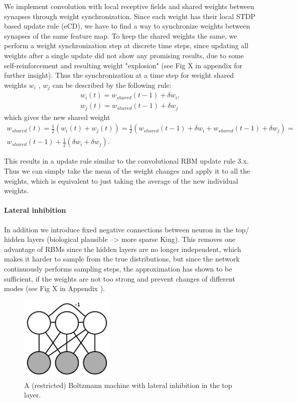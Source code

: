 We implement convolution with local receptive fields and shared weights between synapses through weight synchronization.
Since each weight has their local STDP based update rule (eCD), we have to find a way to synchronize weights between synapses of the same feature map.
To keep the shared weights the same, we perform a weight synchronization step at discrete time steps, since updating all weights after a single update did not show any promising results, due to some self-reinforcement and resulting weight "explosion" (see Fig X in appendix for further insight).
Thus the synchronization at a time step for weight shared weights $w_i$ , $w_j$ can be described by the following rule:  
\[
\begin{split}
w_i(t) = w_{shared}(t-1) + \delta w_i, \\ 
w_j(t) = w_{shared}(t-1) + \delta w_j 
\end{split}
\]
which gives the new shared weight
\[
\begin{split}
w_{shared}(t) = \frac{1}{2} (w_i(t) + w_j(t) ) = \frac{1}{2} (w_{shared}(t-1) + \delta w_i + w_{shared}(t-1) + \delta w_j) = \\ w_{shared}(t-1) + \frac{1}{2} (\delta w_i + \delta w_j).
\end{split}
\]

This results in a update rule similar to the convolutional RBM update rule 3.x.
Thus we can simply take the mean of the weight changes and apply it to all the weights, which is equivalent to just taking the average of the new individual weights. 

\paragraph{Lateral inhibition}
In addition we introduce fixed negative connections between neuron in the top/ hidden layers (biological plausible --> more sparse King).
This removes one advantage of RBMs since the hidden layers are no longer independent, which makes it harder to sample from the true distributions, but since the network continuously performs sampling steps, the approximation has shown to be sufficient, if the weights are not too strong and prevent changes of different modes (see Fig X in Appendix ).

\begin{figure}
	\centering
    	\includegraphics[width=0.4\textwidth]{imgs/lateral_inhib.png} 
    \caption{A (restricted) Boltzmann machine with lateral inhibition in the top layer.}
	\label{fig:bminhib}
\end{figure}


